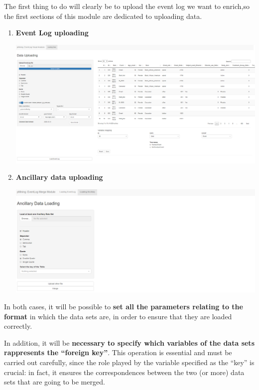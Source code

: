 \documentclass[
]{book}
\begin{document}
The first thing to do will clearly be to upload the event log we want to enrich,so the first sections of this module are dedicated to uploading data.

\begin{enumerate}
\def\labelenumi{\arabic{enumi}.}
\item
  \textbf{Event Log uploading}

  \includegraphics[width=1\textwidth,height=\textheight]{images/el_upload.png}
\item
  \textbf{Ancillary data uploading}

  \includegraphics[width=1\textwidth,height=\textheight]{images/ad_upload.png}
\end{enumerate}

In both cases, it will be possible to \textbf{set all the parameters relating to the format} in which the data sets are, in order to ensure that they are loaded correctly.

In addition, it will be \textbf{necessary to specify which variables of the data sets rappresents the ``foreign key''}. This operation is essential and must be carried out carefully, since the role played by the variable specified as the ``key'' is crucial: in fact, it ensures the correspondences between the two (or more) data sets that are going to be merged.
\end{document}
